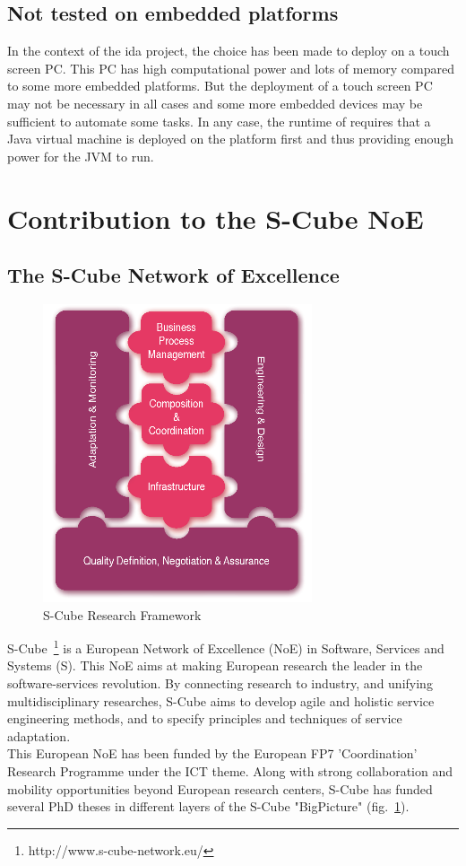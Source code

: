\subsection{Not tested on embedded platforms}

In the context of the \gls{ida} project, the choice has been made to deploy \enti{} on a touch screen PC. This PC has high computational power and lots of memory compared to some more embedded platforms. But the deployment of a touch screen PC may not be necessary in all cases and some more embedded devices may be sufficient to automate some tasks. In any case, the runtime of \enti{} requires that a Java virtual machine is deployed on the platform first and thus providing enough power for the JVM to run.


\section{Contribution to the S-Cube NoE}

\subsection{The S-Cube Network of Excellence}

\begin{figure}
  \centering
  \includegraphics[width=.5\textwidth]{part1/pics/scube-overview.png}
  \caption{S-Cube Research Framework}
  \label{fig:scube-overview2}
\end{figure}
S-Cube~\footnote{http://www.s-cube-network.eu/} is a European Network of Excellence (NoE) in Software, Services and Systems (S). This NoE aims at making European research the leader in the software-services revolution. By connecting research to industry, and unifying multidisciplinary researches, S-Cube aims to develop agile and holistic service engineering methods, and to specify principles and techniques of service adaptation.\\
This European NoE has been funded by the European FP7 'Coordination' Research Programme  under the ICT theme. Along with strong collaboration and mobility opportunities beyond European research centers, S-Cube has funded several PhD theses in different layers of the S-Cube "BigPicture" (fig.~\ref{fig:scube-overview2}).\\

